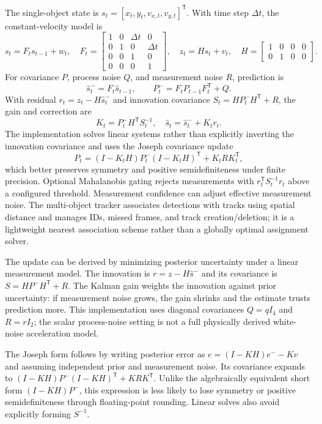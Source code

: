 \documentclass[11pt,a4paper]{article}
\newcommand{\1}{\mathbf{1}}
\begin{document}
The single-object state is $s_t=[x_t,y_t,v_{x,t},v_{y,t}]^{\mathsf T}$. With
time step $\Delta t$, the constant-velocity model is
\[
 s_t=F_ts_{t-1}+w_t,\quad
 F_t=\begin{bmatrix}1&0&\Delta t&0\\0&1&0&\Delta t\\
 0&0&1&0\\0&0&0&1\end{bmatrix},\quad
 z_t=Hs_t+v_t,
 \quad H=\begin{bmatrix}1&0&0&0\\0&1&0&0\end{bmatrix}.
\]
For covariance $P$, process noise $Q$, and measurement noise $R$, prediction is
\[
 \hat{s}^-_t=F_t\hat{s}_{t-1},\qquad P^-_t=F_tP_{t-1}F_t^{\mathsf T}+Q.
\]
With residual $r_t=z_t-H\hat{s}^-_t$ and innovation covariance
$S_t=HP^-_tH^{\mathsf T}+R$, the gain and correction are
\[
 K_t=P^-_tH^{\mathsf T}S_t^{-1},\quad
 \hat{s}_t=\hat{s}^-_t+K_tr_t.
\]
The implementation solves linear systems rather than explicitly inverting the
innovation covariance and uses the Joseph covariance update
\[
 P_t=(I-K_tH)P^-_t(I-K_tH)^{\mathsf T}+K_tRK_t^{\mathsf T},
\]
which better preserves symmetry and positive semidefiniteness under finite
precision. Optional Mahalanobis gating rejects measurements with
$r_t^{\mathsf T}S_t^{-1}r_t$ above a configured threshold. Measurement
confidence can adjust effective measurement noise. The multi-object tracker
associates detections with tracks using spatial distance and manages IDs,
missed frames, and track creation/deletion; it is a lightweight nearest
association scheme rather than a globally optimal assignment solver.

The update can be derived by minimizing posterior uncertainty under a linear
measurement model. The innovation is $r=z-H\hat{s}^-$ and its covariance is
$S=HP^-H^{\mathsf T}+R$. The Kalman gain weights the innovation against prior
uncertainty: if measurement noise grows, the gain shrinks and the estimate
trusts prediction more. This implementation uses diagonal covariances
$Q=qI_4$ and $R=rI_2$; the scalar process-noise setting is not a full
physically derived white-noise acceleration model.

The Joseph form follows by writing posterior error as
$e=(I-KH)e^- - Kv$ and assuming independent prior and measurement noise. Its
covariance expands to
$(I-KH)P^-(I-KH)^{\mathsf T}+KRK^{\mathsf T}$. Unlike the algebraically
equivalent short form $(I-KH)P^-$, this expression is less likely to lose
symmetry or positive semidefiniteness through floating-point rounding. Linear
solves also avoid explicitly forming $S^{-1}$.
\end{document}
